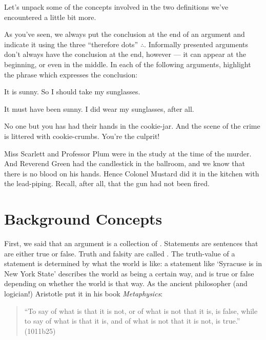  
 \noindent Let's unpack some of the concepts involved in the two definitions we've encountered a little bit more.


\practiceproblems

As you've seen, we always put the conclusion at the end of an argument and indicate it using the three ``therefore dots'' $\therefore$.  Informally presented arguments don't always have the conclusion at the end, however --- it can appear at the beginning, or even in the middle.  In each of the following arguments, highlight the phrase which expresses the conclusion:

\begin{earg}
	\item It is sunny. So I should take my sunglasses.
	\item It must have been sunny. I did wear my sunglasses, after all.
	\item No one but you has had their hands in the cookie-jar. And the scene of the crime is littered with cookie-crumbs. You're the culprit!
	\item Miss Scarlett and Professor Plum were in the study at the time of the murder. And Reverend Green had the candlestick in the ballroom, and we know that there is no blood on his hands. Hence Colonel Mustard did it in the kitchen with the lead-piping. Recall, after all, that the gun had not been fired.
\end{earg}


 
 \section{Background Concepts}\label{s:Background}
 
 First, we said that an argument is a collection of .  Statements are sentences that are either true or false.  Truth and falsity are called .  The truth-value of a statement is determined by what the world is like: a statement like `Syracuse is in New York State' describes the world as being a certain way, and is true or false depending on whether the world is that way.   As the ancient philosopher (and logician!) Aristotle put it in his book \emph{Metaphysics}:

\begin{quote}
``To say of what is that it is not, or of what is not that it is, is false, while to say of what is that it is, and of what is not that it is not, is true.'' (1011b25)
\end{quote}

